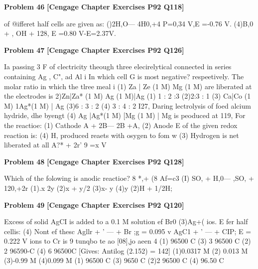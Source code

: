 \begin{problembox}
\textbf{Problem 46} \hfill \textbf{[Cengage Chapter Exercises P92 Q118]}
\label{q:ext-cng-th-46}

of @ifferet half cells are given as:
()2H,O--- 4H0,+4
P=0,34 V,E  =-0.76 V.
(4)B,0 + , OH + 128,
E =0.80 V-E=2.37V.
\end{problembox}

\begin{problembox}
\textbf{Problem 47} \hfill \textbf{[Cengage Chapter Exercises P92 Q126]}
\label{q:ext-cng-th-47}

Ia passing 3 F of clectricity theough three elecirelytical
connected in series containing Ag , C", ad Al i
In which cell G  is most negative?
respeetively. The molar ratio in which the tlree meal i
(1) Za | Ze (1 M) Mg (1 M)  
are liberated at the electrodes is
2)Zn|Za* (1 M) Ag (1 M)|Ag
(1) 1 : 2 :3
(2)2:3 : 1
(3) Ca|Co (1 M) 1Ag*(1 M) | Ag
(3)6 : 3 : 2
(4) 3 : 4 : 2
I27, Daring lectrolysis of foed alcium hydride, dhe byengt
(4) Ag |Ag*(1 M) [Mg  (1 M) | Mg
is peoduced at
119, For the reactioe:
(1) Cathode
A + 2B--- 2B +A,
(2) Anode
E  of the given redox reaction is:
(4) H, produced reaets with osygen to fom w
(3) Hydrogen is net liberated at all
A?* + 2r' 
9 =x V
\end{problembox}

\begin{problembox}
\textbf{Problem 48} \hfill \textbf{[Cengage Chapter Exercises P92 Q128]}
\label{q:ext-cng-th-48}

Which of the folowing is anodic reactioe?
8 *,+ (8
Af=c3
(I) SO, + H,0--- ,SO, + 120,+2r
(1).x  2y
(2)x + y/2
(3)x- y
(4)y 
(2)H +  1/2H;
\end{problembox}

\begin{problembox}
\textbf{Problem 49} \hfill \textbf{[Cengage Chapter Exercises P92 Q120]}
\label{q:ext-cng-th-49}

Excess of solid AgCI is added to a 0.1 M solution ef Br0
(3)Ag+( 
ios. E  fer half cellis:
(4) Nont ef thesc
Agllr + ' ---  + Br ;g  = 0.095 v
AgC1 + ' ---  + CIP; E  = 0.222 V
ions to Cr  is
9 tunqbo te ao [08],jo aeen 4
(1) 96500 C
(3) 3   96500 C
(2) 2   96590-C
(4) 6   96500C
[Gives: Antilog (2.152) = 142]
(1)0.0317 M
(2) 0.013 M
(3)-0.99 M
(4)0.099 M
(1) 96500 C
(3) 9650 C
(2)2   96500 C
(4) 96.50 C
\end{problembox}

